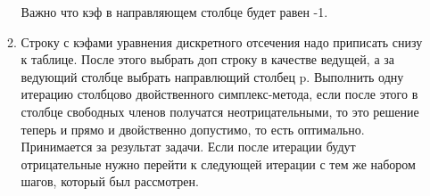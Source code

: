 \begin{enumerate}
\begin{enumerate}
    Важно что кэф в направляющем столбце будет равен -1.
    \item Строку с кэфами уравнения дискретного отсечения надо приписать снизу к таблице. После этого выбрать доп строку в качестве ведущей, а за ведующий столбце выбрать направлющий столбец p.
    Выполнить одну итерацию столбцово двойственного симплекс-метода, если после этого в столбце свободных членов получатся неотрицательными, то это решение теперь и прямо и двойственно допустимо, то есть оптимально.
    Принимается  за результат задачи.
    Если после итерации будут отрицательные нужно перейти к следующей итерации с тем же набором шагов, который был рассмотрен.
  \end{enumerate}
\end{enumerate}
